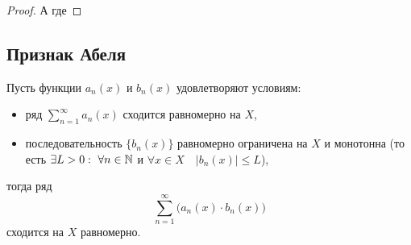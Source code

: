 \begin{proof}
    А где
\end{proof}

\subsection{Признак Абеля}

\begin{theorem}\label{theorem:6.9.1}
    Пусть функции $a_n(x)$ и $b_n(x)$ удовлетворяют условиям:
    \begin{itemize}
        \item ряд $\sum_{n=1}^{\infty}a_n(x)$ сходится равномерно на $X$,
        \item последовательность $\big\{b_n(x)\big\}$ равномерно ограничена на $X$ и монотонна (то есть $\exists L > 0: \ \forall n \in \N$ и $\forall x \in X \quad \big|b_n(x)\big| \leqslant L$),
    \end{itemize}
    тогда ряд
    \[
        \sum_{n=1}^{\infty}\big(a_n(x) \cdot b_n(x)\big)
    \]
    сходится на $X$ равномерно.

\end{theorem}


